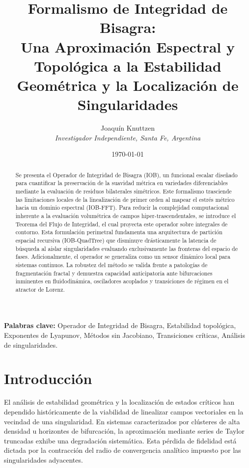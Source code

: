 \documentclass[11pt]{article}
\title{\textbf{Formalismo de Integridad de Bisagra: \\ Una Aproximación Espectral y Topológica a la Estabilidad Geométrica y la Localización de Singularidades}}
\author{Joaquín Knuttzen \\ \small \textit{Investigador Independiente, Santa Fe, Argentina}}
\date{\today}
\begin{document}
\maketitle

\begin{abstract}
Se presenta el Operador de Integridad de Bisagra (IOB), un funcional escalar diseñado para cuantificar la preservación de la suavidad métrica en variedades diferenciables mediante la evaluación de residuos bilaterales simétricos. Este formalismo trasciende las limitaciones locales de la linealización de primer orden al mapear el estrés métrico hacia un dominio espectral (IOB-FFT). Para reducir la complejidad computacional inherente a la evaluación volumétrica de campos hiper-trascendentales, se introduce el Teorema del Flujo de Integridad, el cual proyecta este operador sobre integrales de contorno. Esta formulación perimetral fundamenta una arquitectura de partición espacial recursiva (IOB-QuadTree) que disminuye drásticamente la latencia de búsqueda al aislar singularidades evaluando exclusivamente las fronteras del espacio de fases. Adicionalmente, el operador se generaliza como un sensor dinámico local para sistemas continuos. La robustez del método se valida frente a patologías de fragmentación fractal y demuestra capacidad anticipatoria ante bifurcaciones inminentes en fluidodinámica, osciladores acoplados y transiciones de régimen en el atractor de Lorenz.
\end{abstract}

\vspace{0.5cm}
\noindent \textbf{Palabras clave:} Operador de Integridad de Bisagra, Estabilidad topológica, Exponentes de Lyapunov, Métodos sin Jacobiano, Transiciones críticas, Análisis de singularidades.

\section{Introducción}

El análisis de estabilidad geométrica y la localización de estados críticos han dependido históricamente de la viabilidad de linealizar campos vectoriales en la vecindad de una singularidad. En sistemas caracterizados por clústeres de alta densidad u horizontes de bifurcación, la aproximación mediante series de Taylor truncadas exhibe una degradación sistemática. Esta pérdida de fidelidad está dictada por la contracción del radio de convergencia analítico impuesto por las singularidades adyacentes.
\end{document}
